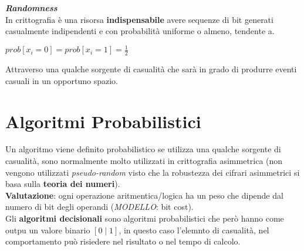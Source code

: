 \textbf{\textit{Randomness}} \\
In crittografia è una risorsa \textbf{indispensabile} avere sequenze di bit generati casualmente indipendenti e con probabilità uniforme o almeno, tendente a.
\begin{center}
    $prob[x_i = 0] = prob[x_i = 1] = \frac{1}{2}$
\end{center}
Attraverso una qualche sorgente di casualità che sarà in grado di produrre eventi casuali in un opportuno spazio.
\begin{center}
\end{center}

\newpage
\section{Algoritmi Probabilistici}
Un algoritmo viene definito probabilistico se utilizza una qualche sorgente di casualità, sono normalmente molto utilizzati in crittografia asimmetrica (non vengono utilizzati \textit{pseudo-random} visto che la robustezza dei cifrari asimmetrici si basa sulla \textbf{teoria dei numeri}). \\
\textbf{Valutazione}: ogni operazione aritmentica/logica ha un peso che dipende dal numero di bit degli operandi (\textit{MODELLO}: bit cost). \\
Gli \textbf{algoritmi decisionali} sono algoritmi probabilistici che però hanno come outpu un valore binario $[0\;|\;1]$, in questo caso l'elemnto di casualità, nel comportamento può risiedere nel risultato o nel tempo di calcolo.

